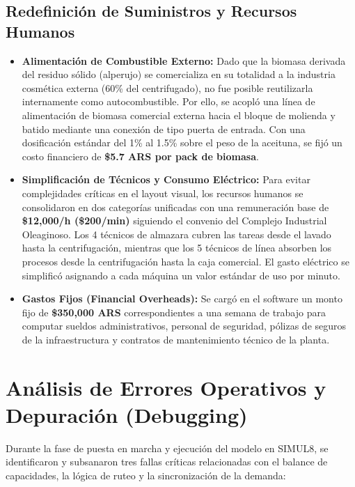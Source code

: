 \documentclass[runningheads]{llncs}
\begin{document}
\subsection{Redefinición de Suministros y Recursos Humanos}
\begin{itemize}
    \item \textbf{Alimentación de Combustible Externo:} Dado que la biomasa derivada del residuo sólido (alperujo) se comercializa en su totalidad a la industria cosmética externa (60\% del centrifugado), no fue posible reutilizarla internamente como autocombustible. Por ello, se acopló una línea de alimentación de biomasa comercial externa hacia el bloque de molienda y batido mediante una conexión de tipo puerta de entrada. Con una dosificación estándar del 1\% al 1.5\% sobre el peso de la aceituna, se fijó un costo financiero de \textbf{\$5.7 ARS por pack de biomasa}.
    \item \textbf{Simplificación de Técnicos y Consumo Eléctrico:} Para evitar complejidades críticas en el layout visual, los recursos humanos se consolidaron en dos categorías unificadas con una remuneración base de \textbf{\$12,000/h (\$200/min)} siguiendo el convenio del Complejo Industrial Oleaginoso. Los 4 técnicos de almazara cubren las tareas desde el lavado hasta la centrifugación, mientras que los 5 técnicos de línea absorben los procesos desde la centrifugación hasta la caja comercial. El gasto eléctrico se simplificó asignando a cada máquina un valor estándar de uso por minuto.
    \item \textbf{Gastos Fijos (Financial Overheads):} Se cargó en el software un monto fijo de \textbf{\$350,000 ARS} correspondientes a una semana de trabajo para computar sueldos administrativos, personal de seguridad, pólizas de seguros de la infraestructura y contratos de mantenimiento técnico de la planta.
\end{itemize}


\section{Análisis de Errores Operativos y Depuración (Debugging)}

Durante la fase de puesta en marcha y ejecución del modelo en SIMUL8, se identificaron y subsanaron tres fallas críticas relacionadas con el balance de capacidades, la lógica de ruteo y la sincronización de la demanda:
\end{document}
